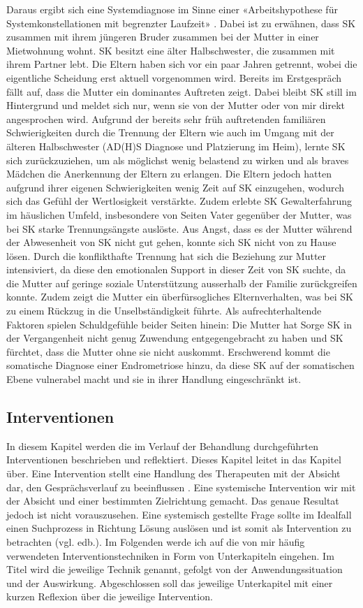 Daraus ergibt sich eine Systemdiagnose im Sinne einer «Arbeitshypothese für Systemkonstellationen mit begrenzter Laufzeit» \cite{Spitzcok1999}. Dabei ist zu erwähnen, dass SK zusammen mit ihrem jüngeren Bruder zusammen bei der Mutter in einer Mietwohnung wohnt. SK besitzt eine älter Halbschwester, die zusammen mit ihrem Partner lebt. Die Eltern haben sich vor ein paar Jahren getrennt, wobei die eigentliche Scheidung erst aktuell vorgenommen wird. Bereits im Erstgespräch fällt auf, dass die Mutter ein dominantes Auftreten zeigt. Dabei bleibt SK still im Hintergrund und meldet sich nur, wenn sie von der Mutter oder von mir direkt angesprochen wird. Aufgrund der bereits sehr früh auftretenden familiären Schwierigkeiten durch die Trennung der Eltern wie auch im Umgang mit der älteren Halbschwester (AD(H)S Diagnose und Platzierung im Heim), lernte SK sich zurückzuziehen, um als möglichst wenig belastend zu wirken und als braves Mädchen die Anerkennung der Eltern zu erlangen. Die Eltern jedoch hatten aufgrund ihrer eigenen Schwierigkeiten wenig Zeit auf SK einzugehen, wodurch sich das Gefühl der Wertlosigkeit verstärkte. Zudem erlebte SK Gewalterfahrung im häuslichen Umfeld, insbesondere von Seiten Vater gegenüber der Mutter, was bei SK starke Trennungsängste auslöste. Aus Angst, dass es der Mutter während der Abwesenheit von SK nicht gut gehen, konnte sich SK nicht von zu Hause lösen. Durch die konflikthafte Trennung hat sich die Beziehung zur Mutter intensiviert, da diese den emotionalen Support in dieser Zeit von SK suchte, da die Mutter auf geringe soziale Unterstützung ausserhalb der Familie zurückgreifen konnte. Zudem zeigt die Mutter ein überfürsogliches Elternverhalten, was bei SK zu einem Rückzug in die Unselbständigkeit führte. Als aufrechterhaltende Faktoren spielen Schuldgefühle beider Seiten hinein: Die Mutter hat Sorge SK in der Vergangenheit nicht genug Zuwendung entgegengebracht zu haben und SK fürchtet, dass die Mutter ohne sie nicht auskommt. Erschwerend kommt die somatische Diagnose einer Endrometriose hinzu, da diese SK auf der somatischen Ebene vulnerabel macht und sie in ihrer Handlung eingeschränkt ist. 

\subsection{Interventionen} 
In diesem Kapitel werden die im Verlauf der Behandlung durchgeführten Interventionen beschrieben und reflektiert. Dieses Kapitel leitet in das Kapitel  über. Eine Intervention stellt eine Handlung des Therapeuten mit der Absicht dar, den Gesprächsverlauf zu beeinflussen \cite{Starke2019}. Eine systemische Intervention wir mit der Absicht und einer bestimmten Zielrichtung gemacht. Das genaue Resultat jedoch ist nicht vorauszusehen. Eine systemisch gestellte Frage sollte im Idealfall einen Suchprozess in Richtung Lösung auslösen und ist somit als Intervention zu betrachten (vgl. edb.). Im Folgenden werde ich auf die von mir häufig verwendeten Interventionstechniken in Form von Unterkapiteln eingehen. Im Titel wird die jeweilige Technik genannt, gefolgt von der Anwendungssituation und der Auswirkung. Abgeschlossen soll das jeweilige Unterkapitel mit einer kurzen Reflexion über die jeweilige Intervention.

